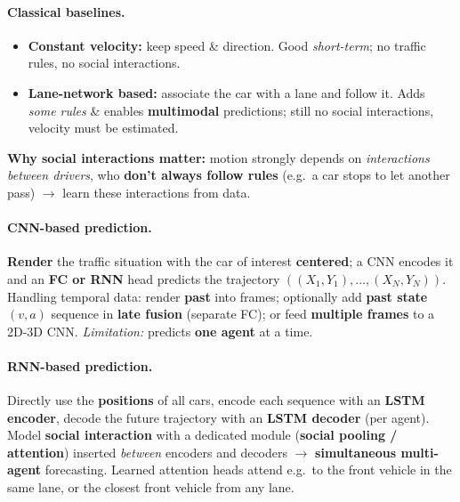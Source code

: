 \documentclass{article}
\begin{document}
\paragraph{Classical baselines.}
\begin{itemize}
    \item \textbf{Constant velocity:} keep speed \& direction. Good \textit{short-term}; no traffic rules, no social interactions.
    \item \textbf{Lane-network based:} associate the car with a lane and follow it. Adds \textit{some rules} \& enables \textbf{multimodal} predictions; still no social interactions, velocity must be estimated.
\end{itemize}
\textbf{Why social interactions matter:} motion strongly depends on \textit{interactions between drivers}, who \textbf{don't always follow rules} (e.g.\ a car stops to let another pass) $\rightarrow$ learn these interactions from data.

\paragraph{CNN-based prediction.}
\textbf{Render} the traffic situation with the car of interest \textbf{centered}; a CNN encodes it and an \textbf{FC or RNN} head predicts the trajectory $((X_1,Y_1),\dots,(X_N,Y_N))$. Handling temporal data: render \textbf{past} into frames; optionally add \textbf{past state} $(v,a)$ sequence in \textbf{late fusion} (separate FC); or feed \textbf{multiple frames} to a 2D-3D CNN. \textit{Limitation:} predicts \textbf{one agent} at a time.

\paragraph{RNN-based prediction.}
Directly use the \textbf{positions} of all cars, encode each sequence with an \textbf{LSTM encoder}, decode the future trajectory with an \textbf{LSTM decoder} (per agent). Model \textbf{social interaction} with a dedicated module (\textbf{social pooling / attention}) inserted \textit{between} encoders and decoders $\rightarrow$ \textbf{simultaneous multi-agent} forecasting. Learned attention heads attend e.g.\ to the front vehicle in the same lane, or the closest front vehicle from any lane.
\end{document}
